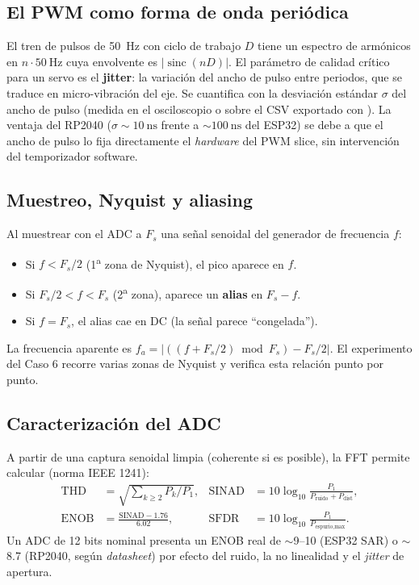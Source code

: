 \documentclass[11pt]{article}
\begin{document}
\subsection{El PWM como forma de onda periódica}
El tren de pulsos de \SI{50}{\hertz} con ciclo de trabajo $D$ tiene un espectro de
armónicos en $n\cdot\SI{50}{\hertz}$ cuya envolvente es $\lvert\operatorname{sinc}(nD)\rvert$.
El parámetro de calidad crítico para un servo es el \textbf{jitter}: la variación del
ancho de pulso entre periodos, que se traduce en micro-vibración del eje. Se cuantifica
con la desviación estándar $\sigma$ del ancho de pulso (medida en el osciloscopio o
sobre el CSV exportado con ). La ventaja del RP2040
($\sigma\sim\SI{10}{\nano\second}$ frente a $\sim\SI{100}{\nano\second}$ del ESP32) se
debe a que el ancho de pulso lo fija directamente el \emph{hardware} del PWM slice, sin
intervención del temporizador software.

\subsection{Muestreo, Nyquist y aliasing}
Al muestrear con el ADC a $F_s$ una señal senoidal del generador de frecuencia $f$:
\begin{itemize}
  \item Si $f < F_s/2$ (1\textsuperscript{a} zona de Nyquist), el pico aparece en $f$.
  \item Si $F_s/2 < f < F_s$ (2\textsuperscript{a} zona), aparece un \textbf{alias} en
        $F_s - f$.
  \item Si $f = F_s$, el alias cae en DC (la señal parece ``congelada'').
\end{itemize}
La frecuencia aparente es
$f_a = \lvert ((f + F_s/2)\bmod F_s) - F_s/2\rvert$. El experimento del Caso 6 recorre
varias zonas de Nyquist y verifica esta relación punto por punto.

\subsection{Caracterización del ADC}
A partir de una captura senoidal limpia (coherente si es posible), la FFT permite
calcular (norma IEEE 1241):
\begin{align}
  \text{THD} &= \sqrt{\textstyle\sum_{k\ge 2} P_k / P_1}, &
  \text{SINAD} &= 10\log_{10}\!\frac{P_1}{P_\text{ruido}+P_\text{dist}}, \\
  \text{ENOB} &= \frac{\text{SINAD} - 1.76}{6.02}, &
  \text{SFDR} &= 10\log_{10}\!\frac{P_1}{P_\text{espurio,max}}.
\end{align}
Un ADC de 12 bits nominal presenta un ENOB real de $\sim$9--10 (ESP32 SAR) o $\sim$8.7
(RP2040, según \emph{datasheet}) por efecto del ruido, la no linealidad y el
\emph{jitter} de apertura.
\end{document}
